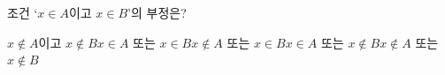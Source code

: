 조건 `$x\in A$이고 $x\in B$'의 부정은?
\begin{choicesii}{$x\notin A$이고 $x\notin B$}{$x\in A$ 또는 $x\in B$}{$x\notin A$ 또는 $x\in B$}{$x\in A$ 또는 $x\notin B$}{$x\notin A$ 또는 $x\notin B$}\end{choicesii}
